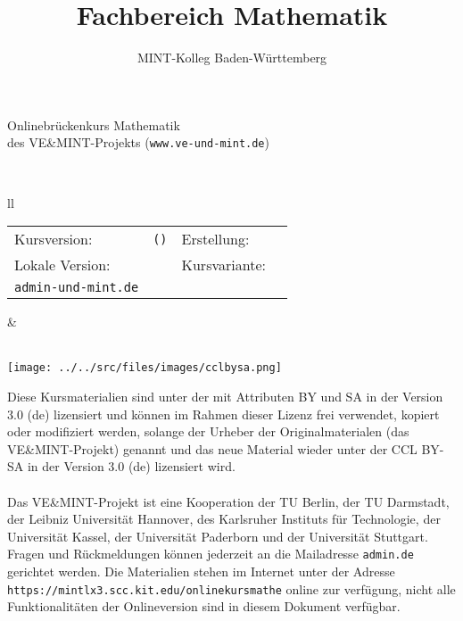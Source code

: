 

\title{Fachbereich Mathematik}
\author{MINT-Kolleg Baden-W\"urttemberg}



\MSetSubject{\MINTMathematics}

\begin{framed}
\begin{center}
\LARGE
Onlinebrückenkurs Mathematik\\
\large
des VE\&MINT-Projekts (\texttt{www.ve-und-mint.de})
\end{center}
\ \\
\begin{tabular}{ll}
\begin{minipage}{12.5cm}
\begin{tabular}{llll}
Kursversion: & \texttt{\MSignatureMain (\MSignatureVersion)} &
Erstellung: & \MSignatureDate\\
Lokale Version: & \texttt{\MSignatureLocalization} &
Kursvariante: & \texttt{\MSignatureVariant}\\
\scriptsize \texttt{admin\@@ve-und-mint.de}
\end{tabular}
\end{minipage}
&
\begin{minipage}{3cm}
\ \\
\texttt{[image: ../../src/files/images/cclbysa.png]}
\end{minipage}
\end{tabular}
\end{framed}

Diese Kursmaterialien sind unter der 
mit Attributen BY und SA in der Version 3.0 (de) lizensiert und können im Rahmen dieser
Lizenz frei verwendet, kopiert oder modifiziert werden, solange der Urheber der Originalmaterialen (das VE\&MINT-Projekt) genannt
und das neue Material wieder unter der CCL BY-SA in der Version 3.0 (de) lizensiert wird.
\ \\ \ \\
Das VE\&MINT-Projekt ist eine Kooperation der TU Berlin, der TU Darmstadt, der Leibniz Universität Hannover, des Karlsruher
Instituts für Technologie, der Universität Kassel, der Universität Paderborn und der Universität Stuttgart.
Fragen und Rückmeldungen können jederzeit an die Mailadresse \texttt{admin\@@veundmint.de} gerichtet werden.
Die Materialien stehen im Internet unter der Adresse \texttt{https://mintlx3.scc.kit.edu/onlinekursmathe}
online zur verfügung, nicht alle Funktionalitäten der Onlineversion sind in diesem Dokument verfügbar.




\tableofcontents



\MPrintIndex



